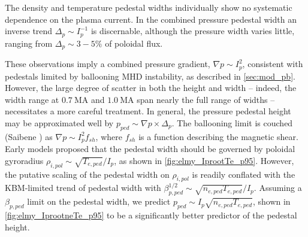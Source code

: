 The density and temperature pedestal widths individually show no systematic dependence on the plasma current.  In the combined pressure pedestal width an inverse trend $\Delta_p \sim I_p^{-1}$ is discernable, although the pressure width varies little, ranging from $\Delta_p \sim 3-5\%$ of poloidal flux.

These observations imply a combined pressure gradient, $\nabla p \sim I_p^2$, consistent with pedestals limited by ballooning MHD instability, as described in \cref{sec:mod_pb}.  However, the large degree of scatter in both the height and width -- indeed, the width range at $\SI{0.7}{\mega\ampere}$ and $\SI{1.0}{\mega\ampere}$ span nearly the full range of widths -- necessitates a more careful treatment.  In general, the pressure  pedestal height may be approximated well by $p_{ped} \sim \nabla p \times \Delta_p$.  The ballooning limit is couched (\cf Saibene \etal \cite{Saibene1999}) as $\nabla p \sim I_p^2 f_{sh}$, where $f_{sh}$ is a function describing the magnetic shear.  Early models proposed that the pedestal width should be governed by poloidal gyroradius $\rho_{i,pol} \sim \sqrt{T_{e,ped}}/I_p$, as shown in \cref{fig:elmy_IprootTe_p95}.  However, the putative scaling of the pedestal width on $\rho_{i,pol}$ is readily conflated with the KBM-limited trend of pedestal width with $\beta_{p,ped}^{1/2} \sim \sqrt{n_{e,ped} T_{e,ped}}/I_p$.  Assuming a $\beta_{p,ped}$ limit on the pedestal width, we predict $p_{ped} \sim I_p \sqrt{n_{e,ped} T_{e,ped}}$, shown in \cref{fig:elmy_IprootneTe_p95} to be a significantly better predictor of the pedestal height.

